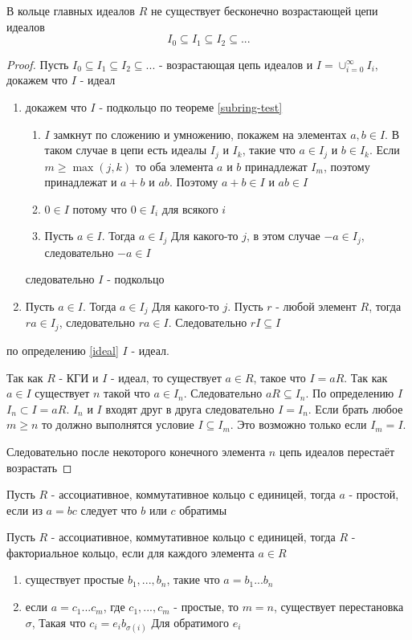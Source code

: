 \documentclass[../main/document.tex]{subfiles}
\begin{document}
\begin{thm}\label{ascending-chain-condition}
В кольце главных идеалов $R$ не существует бесконечно возрастающей цепи идеалов
$$I_0\subseteq I_1\subseteq I_2\subseteq ...$$
\begin{proof}
Пусть $I_0\subseteq I_1\subseteq I_2\subseteq ...$ - возрастающая цепь идеалов и $I=\cup_{i=0}^\infty I_i$, докажем что $I$ - идеал
\begin{enumerate}
\item докажем что $I$ - подкольцо по теореме \ref{subring-test}
\begin{enumerate}
\item $I$ замкнут по сложению и умножению, покажем на элементах $a,b\in I$. В таком случае в цепи есть идеалы $I_j$ и $I_k$, такие что $a\in I_j$ и $b\in I_k$. Если $m\geq \max(j,k)$ то оба элемента $a$ и $b$ принадлежат $I_m$, поэтому принадлежат и $a+b$ и $ab$. Поэтому $a+b\in I$ и $ab\in I$
\item $0\in I$ потому что $0\in I_i$ для всякого $i$
\item Пусть $a\in I$. Тогда $a\in I_j$ Для какого-то $j$, в этом случае $-a\in I_j$, следовательно $-a\in I$
\end{enumerate}
следовательно $I$ - подкольцо
\item Пусть $a\in I$. Тогда $a\in I_j$ Для какого-то $j$. Пусть $r$ - любой элемент $R$, тогда $ra\in I_j$, следовательно $ra\in I$. Следовательно $rI\subseteq I$
\end{enumerate}
по определению \ref{ideal} $I$ - идеал.

Так как $R$ - КГИ и $I$ - идеал, то существует $a\in R$, такое что $I=aR$. Так как $a\in I$ существует $n$ такой что $a\in I_n$. Следовательно $aR\subseteq I_n$. По определению $I$ $I_n\subset I=aR$. $I_n$ и $I$ входят друг в друга следовательно $I=I_n$. Если брать любое $m\geq n$ то должно выполнятся условие $I\subseteq I_m$. Это возможно только если $I_m=I$.

 Следовательно после некоторого конечного элемента $n$ цепь идеалов перестаёт возрастать
\end{proof}
\end{thm}
\begin{dfn}
Пусть $R$ - ассоциативное, коммутативное кольцо с единицей, тогда $a$ - простой, если из $a=bc$ следует что $b$ или $c$ обратимы
\end{dfn}
\begin{dfn}\label{factorial-ring}
Пусть $R$ - ассоциативное, коммутативное кольцо с единицей, тогда $R$ - факториальное кольцо, если для каждого элемента $a\in R$
\begin{enumerate}
\item существует простые $b_1,...,b_n$, такие что $a=b_1...b_n$
\item если $a=c_1...c_m$, где $c_1,...,c_m$ - простые, то $m=n$, существует перестановка $\sigma$, Такая что $c_i=e_ib_{\sigma(i)}$ Для обратимого $e_i$
\end{enumerate} 
\end{dfn}
\end{document}
